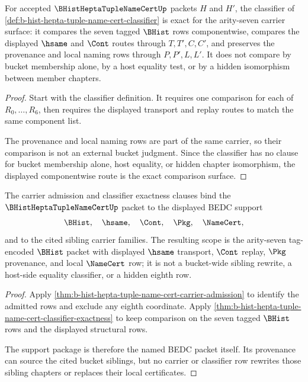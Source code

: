 \begin{theorem}
\label{thm:b-hist-hepta-tuple-name-cert-classifier-exactness}
For accepted $\BHistHeptaTupleNameCertUp$ packets $H$ and $H'$, the classifier of \autoref{def:b-hist-hepta-tuple-name-cert-classifier} is exact for the arity-seven carrier surface: it compares the seven tagged $\BHist$ rows componentwise, compares the displayed $\hsame$ and $\Cont$ routes through $T,T',C,C'$, and preserves the provenance and local naming rows through $P,P',L,L'$. It does not compare by bucket membership alone, by a host equality test, or by a hidden isomorphism between member chapters.
\end{theorem}
\begin{proof}
Start with the classifier definition. It requires one comparison for each of $R_0,\ldots,R_6$, then requires the displayed transport and replay routes to match the same component list.

The provenance and local naming rows are part of the same carrier, so their comparison is not an external bucket judgment. Since the classifier has no clause for bucket membership alone, host equality, or hidden chapter isomorphism, the displayed componentwise route is the exact comparison surface.
\end{proof}

\begin{theorem}
\label{thm:b-hist-hepta-tuple-name-cert-scoped-support-package}
The carrier admission and classifier exactness clauses bind the $\BHistHeptaTupleNameCertUp$ packet to the displayed BEDC support
$$
\BHist,\quad \hsame,\quad \Cont,\quad \Pkg,\quad \NameCert,
$$
and to the cited sibling carrier families. The resulting scope is the arity-seven tag-encoded $\BHist$ packet with displayed $\hsame$ transport, $\Cont$ replay, $\Pkg$ provenance, and local $\NameCert$ row; it is not a bucket-wide sibling rewrite, a host-side equality classifier, or a hidden eighth row.
\end{theorem}
\begin{proof}
Apply \autoref{thm:b-hist-hepta-tuple-name-cert-carrier-admission} to identify the admitted rows and exclude any eighth coordinate. Apply \autoref{thm:b-hist-hepta-tuple-name-cert-classifier-exactness} to keep comparison on the seven tagged $\BHist$ rows and the displayed structural rows.

The support package is therefore the named BEDC packet itself. Its provenance can source the cited bucket siblings, but no carrier or classifier row rewrites those sibling chapters or replaces their local certificates.
\end{proof}

